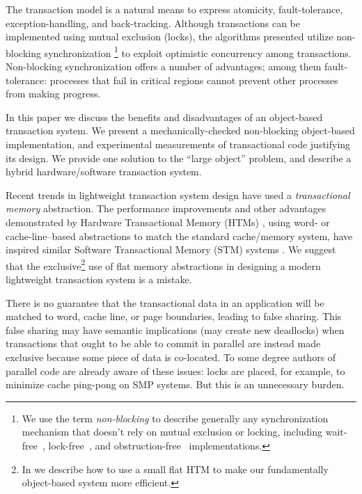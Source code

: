 \documentclass{csa-sig-alternate}
\begin{document}
%
The transaction model is a natural means to express atomicity,
fault-tolerance, exception-handling, and back-tracking.
Although transactions can be implemented using mutual exclusion
(locks), the algorithms presented utilize non-blocking synchronization%
\footnote{We use the term \emph{non-blocking} to describe
generally any synchronization mechanism that doesn't rely on mutual
exclusion or locking, including wait-free~\cite{Herlihy88},
lock-free~\cite{MassalinPu91},
and obstruction-free~\cite{HerlihyLuMo03} implementations.}
to exploit optimistic concurrency among transactions.
Non-blocking synchronization offers a number of advantages; among them
fault-tolerance: processes that
fail in critical regions cannot prevent other processes from making
progress.

In this paper we discuss the benefits and disadvantages of an
object-based transaction system. We present a mechanically-checked
non-blocking object-based implementation, and experimental
measurements of transactional code justifying its design.  We
provide one solution to the ``large object'' problem, and describe a
hybrid hardware/software transaction system.

Recent trends in lightweight transaction system design have used
a \emph{transactional memory} abstraction.  The performance
improvements and other advantages demonstrated by
Hardware Transactional Memory (HTMs)
\cite{Knight86,HerlihyMo92,HerlihyMo93,HammondWoCh04,AnanianAsKuLeLi04},
using word- or cache-line--based abstractions to match the standard
cache/memory system,
have inspired similar Software Transactional Memory (STM) systems
\cite{ShavitTo95,HarrisFr03}.  We suggest that the
exclusive\footnote{In  we describe how to use a small
  flat HTM to make our fundamentally object-based system more efficient.}
use of flat memory abstractions in designing a modern lightweight
transaction system is a mistake.

There is no guarantee that the transactional data in an application
will be matched to word, cache line, or page boundaries, leading to
false sharing.  This false sharing may have semantic implications
(may create new deadlocks) when
transactions that ought to be able to commit in parallel are instead
made exclusive because some piece of data is co-located.  To some
degree authors of parallel code are already aware of these issues: locks
are placed, for example, to minimize cache ping-pong on SMP
systems.  But this is an unnecessary burden.
\end{document}
